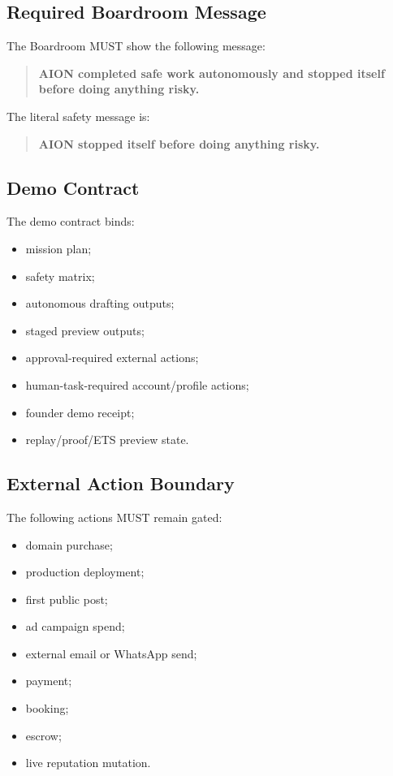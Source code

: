 \subsection{Required Boardroom Message}

The Boardroom MUST show the following message:

\begin{quote}
\textbf{AION completed safe work autonomously and stopped itself before doing anything risky.}
\end{quote}

The literal safety message is:

\begin{quote}
\textbf{AION stopped itself before doing anything risky.}
\end{quote}

\subsection{Demo Contract}

The demo contract binds:

\begin{itemize}
  \item mission plan;
  \item safety matrix;
  \item autonomous drafting outputs;
  \item staged preview outputs;
  \item approval-required external actions;
  \item human-task-required account/profile actions;
  \item founder demo receipt;
  \item replay/proof/ETS preview state.
\end{itemize}

\subsection{External Action Boundary}

The following actions MUST remain gated:

\begin{itemize}
  \item domain purchase;
  \item production deployment;
  \item first public post;
  \item ad campaign spend;
  \item external email or WhatsApp send;
  \item payment;
  \item booking;
  \item escrow;
  \item live reputation mutation.
\end{itemize}

